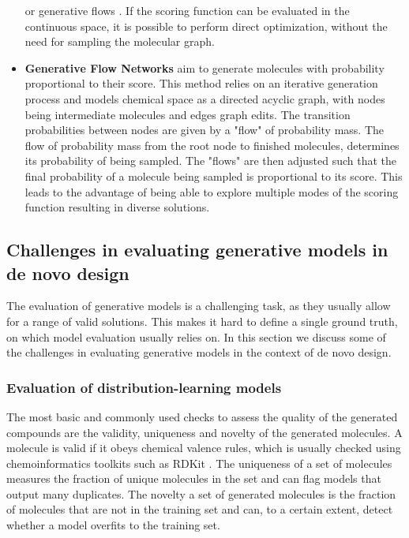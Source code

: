 \begin{itemize}
            or generative flows \citep{madhawaGraphNVPInvertibleFlow2019}. If the scoring function
            can be evaluated in the continuous space, it is possible to perform direct optimization,
            without the need for sampling the molecular graph.
      \item \textbf{Generative Flow Networks} \citep{bengioFlowNetworkBased2021} aim to generate
            molecules with probability proportional to their score. This method relies on an
            iterative generation process and models chemical space as a directed acyclic graph, with
            nodes being intermediate molecules and edges graph edits. The transition probabilities
            between nodes are given by a "flow" of probability mass. The flow of probability mass
            from the root node to finished molecules, determines its probability of being sampled.
            The "flows" are then adjusted such that the final probability of a molecule being sampled is
            proportional to its score. This leads to the advantage of being able to explore
            multiple modes of the scoring function resulting in diverse solutions.
\end{itemize}

\subsection{Challenges in evaluating generative models in de novo design}
The evaluation of generative models is a challenging task, as they usually allow for a
range of valid solutions. This makes it hard to define a single ground truth, on which model
evaluation usually relies on. In this section we discuss some of the challenges in evaluating
generative models in the context of de novo design.

\subsubsection{Evaluation of distribution-learning models}
The most basic and commonly used checks to assess the quality of the generated compounds are the
validity, uniqueness and novelty of the generated molecules. A molecule is valid if it obeys
chemical valence rules, which is usually checked using chemoinformatics toolkits such as RDKit
\citep{landrumRDKitOpensourceCheminformatics2006}. The uniqueness of a set of molecules measures the
fraction of unique molecules in the set and can flag models that output many duplicates. The novelty
a set of generated molecules is the fraction of molecules that are not in the training set and can,
to a certain extent, detect whether a model overfits to the training set.

